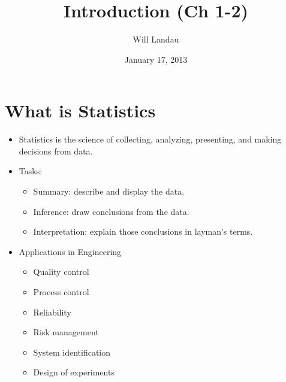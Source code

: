 \documentclass[handout]{beamer}\usepackage{graphicx, color}
\title{Introduction (Ch 1-2)}
\author{Will Landau}
\date{January 17, 2013}
\institute{Iowa State University}
\numberwithin{equation}{section}
\begin{document}
\begin{frame}
\titlepage
 \end{frame}
 

\section{What is Statistics}

\begin{frame}
\begin{itemize}
\item Statistics is the science of collecting, analyzing, presenting, and making decisions from data. \pause
\item Tasks:
\begin{itemize}
\item Summary: describe and display the data. \pause
\item Inference: draw conclusions from the data.  \pause
\item Interpretation: explain those conclusions in layman's terms. 
\end{itemize}
 \pause \item Applications in Engineering 
\begin{itemize}
\item Quality control \pause
\item Process control \pause
\item Reliability \pause
\item Risk management \pause
\item System identification \pause
\item Design of experiments 
\end{itemize}
\end{itemize}
\end{frame}
\end{document}
